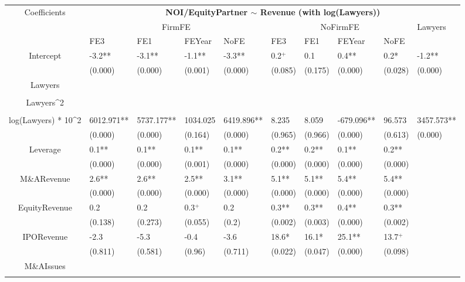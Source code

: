 \documentclass{article}
\begin{document}
\begin{table}[H]
\centering
\begin{tabular}{|clllllllll|}
\hline
\multirow{3}{*}{Coefficients} & \multicolumn{9}{c|}{\textbf{NOI/EquityPartner $\sim$ Revenue (with log(Lawyers))}} \\
\cline{2-10}
& \multicolumn{4}{c}{FirmFE} & \multicolumn{4}{c}{NoFirmFE} & \multirow{2}{*}{Lawyers} \\
\cline{2-9}
& FE3 & FE1 & FEYear & NoFE & FE3 & FE1 & FEYear & NoFE &  \\
\hline
 
Intercept & -3.2** & -3.1** & -1.1** & -3.3** & 0.2$^{+}$ & 0.1 & 0.4** & 0.2* & -1.2** \\ 
   & (0.000) & (0.000) & (0.001) & (0.000) & (0.085) & (0.175) & (0.000) & (0.028) & (0.000) \\ 
  Lawyers &  &  &  &  &  &  &  &  &  \\ 
   &  &  &  &  &  &  &  &  &  \\ 
  Lawyers^2 &  &  &  &  &  &  &  &  &  \\ 
   &  &  &  &  &  &  &  &  &  \\ 
  log(Lawyers) * 10^2 & 6012.971** & 5737.177** & 1034.025 & 6419.896** & 8.235 & 8.059 & -679.096** & 96.573 & 3457.573** \\ 
   & (0.000) & (0.000) & (0.164) & (0.000) & (0.965) & (0.966) & (0.000) & (0.613) & (0.000) \\ 
  Leverage & 0.1** & 0.1** & 0.1** & 0.1** & 0.2** & 0.2** & 0.1** & 0.2** &  \\ 
   & (0.000) & (0.000) & (0.001) & (0.000) & (0.000) & (0.000) & (0.000) & (0.000) &  \\ 
  M\&ARevenue & 2.6** & 2.6** & 2.5** & 3.1** & 5.1** & 5.1** & 5.4** & 5.4** &  \\ 
   & (0.000) & (0.000) & (0.000) & (0.000) & (0.000) & (0.000) & (0.000) & (0.000) &  \\ 
  EquityRevenue & 0.2 & 0.2 & 0.3$^{+}$ & 0.2 & 0.3** & 0.3** & 0.4** & 0.3** &  \\ 
   & (0.138) & (0.273) & (0.055) & (0.2) & (0.002) & (0.003) & (0.000) & (0.002) &  \\ 
  IPORevenue & -2.3 & -5.3 & -0.4 & -3.6 & 18.6* & 16.1* & 25.1** & 13.7$^{+}$ &  \\ 
   & (0.811) & (0.581) & (0.96) & (0.711) & (0.022) & (0.047) & (0.000) & (0.098) &  \\ 
  M\&AIssues &  &  &  &  &  &  &  &  &  \\ 
   &  &  &  &  &  &  &  &  &  \\ 

\end{tabular}
\end{table}
\end{document}
